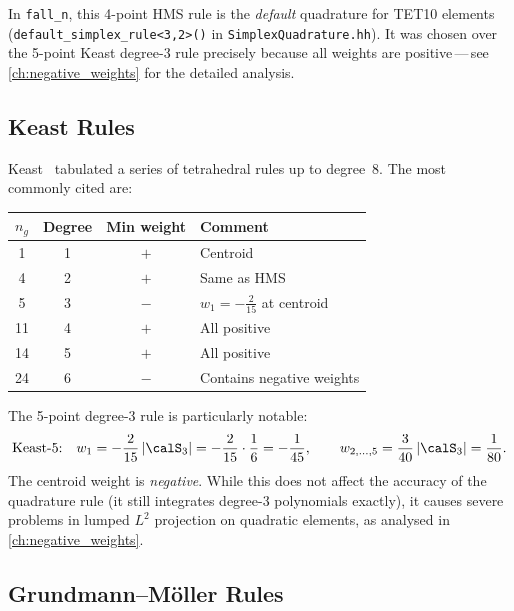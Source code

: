 \begin{remark}
In \texttt{fall\_n}, this 4-point HMS rule is the \emph{default} quadrature
for TET10 elements (\texttt{default\_simplex\_rule<3,2>()} in
\texttt{SimplexQuadrature.hh}).  It was chosen over the 5-point Keast degree-3
rule precisely because all weights are positive\,---\,see
\cref{ch:negative_weights} for the detailed analysis.
\end{remark}


\subsection{Keast Rules}
\label{sec:keast}

Keast~\cite{Keast1986} tabulated a series of tetrahedral rules up to degree~8.
The most commonly cited are:

\begin{center}
\begin{tabular}{cccl}
  \toprule
  $n_g$ & Degree & Min weight & Comment \\
  \midrule
  1     & 1    & $+$      & Centroid \\
  4     & 2    & $+$      & Same as HMS \\
  5     & 3    & $\mathbf{-}$ & $w_1 = -\tfrac{2}{15}$ at centroid \\
  11    & 4    & $+$      & All positive \\
  14    & 5    & $+$      & All positive \\
  24    & 6    & $\mathbf{-}$ & Contains negative weights \\
  \bottomrule
\end{tabular}
\end{center}

The 5-point degree-3 rule is particularly notable:
\begin{equation}
  \text{Keast-5:}\quad
  w_1 = -\frac{2}{15}\,|\calS_3| = -\frac{2}{15} \cdot \frac{1}{6}
      = -\frac{1}{45},\qquad
  w_{2,\dots,5} = \frac{3}{40}\,|\calS_3| = \frac{1}{80}.
  \label{eq:keast5_weights}
\end{equation}
The centroid weight is \emph{negative}.  While this does not affect the
accuracy of the quadrature rule (it still integrates degree-3 polynomials
exactly), it causes severe problems in lumped $L^2$ projection on quadratic
elements, as analysed in \cref{ch:negative_weights}.


\subsection{Grundmann--M\"oller Rules}


